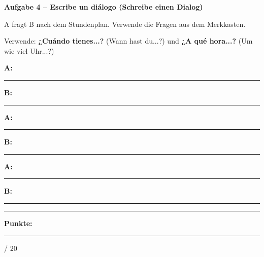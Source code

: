 \documentclass[11pt, a4paper]{article}
\newcommand{\fachfarbe}{spanisch}
\newcommand{\maxpunkte}{20}
\newcommand{\punktebox}[1]{\hfill\fbox{\small \_/#1}}
\newcommand{\luecke}[1]{\rule{#1}{0.4pt}}
\newenvironment{aufgabe}[1]{%
    \needspace{5\baselineskip}%
    \nopagebreak[4]%
    \vspace{10pt}
    \noindent\textbf{\textcolor{\fachfarbe}{Aufgabe #1}}
    \nopagebreak[4]%
    \vspace{5pt}
    \nopagebreak[4]%
    \begin{list}{}{\leftmargin=0pt}
    \item[]
}{%
    \end{list}
}
\newcommand{\es}[1]{\textcolor{\fachfarbe}{\textbf{#1}}}
\begin{document}
\begin{aufgabe}{4 -- Escribe un diálogo (Schreibe einen Dialog)}
A fragt B nach dem Stundenplan. Verwende die Fragen aus dem Merkkasten. \punktebox{6}
\end{aufgabe}

\begin{hinweis}
Verwende: \es{¿Cuándo tienes...?} (Wann hast du...?) und \es{¿A qué hora...?} (Um wie viel Uhr...?)
\end{hinweis}

\vspace{0.5em}

\noindent
\textbf{A:} \luecke{12cm}

\vspace{1em}

\noindent
\textbf{B:} \luecke{12cm}

\vspace{1em}

\noindent
\textbf{A:} \luecke{12cm}

\vspace{1em}

\noindent
\textbf{B:} \luecke{12cm}

\vspace{1em}

\noindent
\textbf{A:} \luecke{12cm}

\vspace{1em}

\noindent
\textbf{B:} \luecke{12cm}


\vspace{20pt}
\hrule
\vspace{10pt}

\begin{flushright}
\textbf{Punkte:} \luecke{1cm} / \maxpunkte
\end{flushright}
\end{document}
